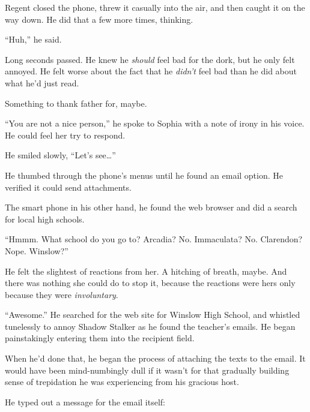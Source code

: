 Regent closed the phone, threw it casually into the air, and then caught it on the way down.  He did that a few more times, thinking.



``Huh,'' he said.



Long seconds passed.  He knew he \emph{should} feel bad for the dork, but he only felt annoyed.  He felt worse about the fact that he \emph{didn't} feel bad than he did about what he'd just read.



Something to thank father for, maybe.



``You are not a nice person,'' he spoke to Sophia with a note of irony in his voice.  He could feel her try to respond.



He smiled slowly, ``Let's see\ldots''



He thumbed through the phone's menus until he found an email option.  He verified it could send attachments.



The smart phone in his other hand, he found the web browser and did a search for local high schools.



``Hmmm.  What school do you go to?  Arcadia?  No.  Immaculata?  No.  Clarendon?  Nope.  Winslow?''



He felt the slightest of reactions from her.  A hitching of breath, maybe.  And there was nothing she could do to stop it, because the reactions were hers only because they were \emph{involuntary}.



``Awesome.''  He searched for the web site for Winslow High School, and whistled tunelessly to annoy Shadow Stalker as he found the teacher's emails.  He began painstakingly entering them into the recipient field.



When he'd done that, he began the process of attaching the texts to the email.  It would have been mind-numbingly dull if it wasn't for that gradually building sense of trepidation he was experiencing from his gracious host.



He typed out a message for the email itself:



